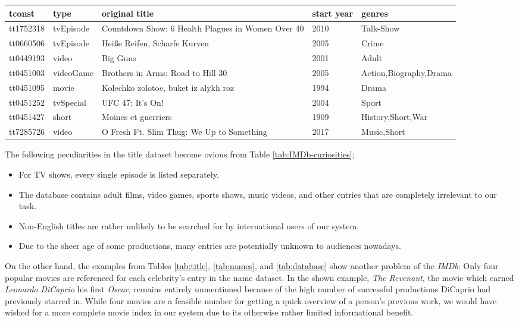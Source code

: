 \documentclass[11pt,a4paper]{article}
\begin{document}
\begin{table*}[t]
		\small
		\begin{tabular}{lllll}
			\toprule[0.5mm]
tconst & type & original title & start year & genres \\
			\midrule
tt1752318&tvEpisode&Countdown Show: 6 Health Plagues in Women Over 40&2010&Talk-Show\\[0.5mm]
tt0660506&tvEpisode&Heiße Reifen, Scharfe Kurven&2005&Crime\\
tt0449193&video&Big Guns&2001&Adult\\
tt0451003&videoGame&Brothers in Arms: Road to Hill 30&2005&Action,Biography,Drama\\
tt0451095&movie&Kolechko zolotoe, buket iz alykh roz&1994&Drama\\
tt0451252&tvSpecial&UFC 47: It's On!&2004&Sport\\
tt0451427&short&Moines et guerriers&1909&History,Short,War\\
tt7285726&video&O Fresh Ft. Slim Thug: We Up to Something&2017&Music,Short\\
			\bottomrule[0.5mm]
		\end{tabular}
		\caption{Examples of irrelevant titles in the \textit{IMDb}.}
		\label{tab:IMDb-curiosities}
\end{table*}		
The following peculiarities in the title dataset become ovious from Table \ref{tab:IMDb-curiosities};
\begin{itemize}
\item For TV shows, every single episode is listed separately.
\item The database contains adult films, video games, sports shows, music videos, and other entries that are completely irrelevant to our task.
\item Non-English titles are rather unlikely to be searched for by international users of our system.
\item Due to the sheer age of some productions, many entries are potentially unknown to audiences nowadays.
\end{itemize}

On the other hand, the examples from Tables \ref{tab:title}, \ref{tab:names}, and \ref{tab:database} show another problem of the \textit{IMDb}: Only four popular movies are referenced for each celebrity's entry in the name dataset. In the shown example, \emph{The Revenant}, the movie which earned \emph{Leonardo DiCaprio} his first \emph{Oscar}, remains entirely unmentioned because of the high number of successful productions DiCaprio had previously starred in. While four movies are a feasible number for getting a quick overview of a person's previous work, we would have wished for a more complete movie index in our system due to its otherwise rather limited informational benefit. 
\end{document}
